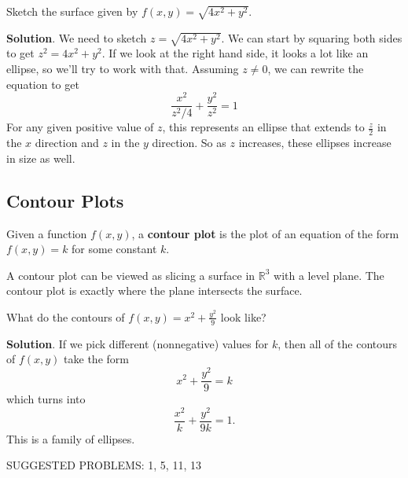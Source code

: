 \documentclass[10pt,]{book}
\newcommand{\terminology}[1]{\textbf{#1}}
\theoremstyle{ptxplainnotitle}
\theoremstyle{ptxplaintitle}
\theoremstyle{ptxplainnotitle}
\theoremstyle{ptxplaintitle}
\theoremstyle{ptxplainnotitle}
\theoremstyle{ptxplaintitle}
\theoremstyle{ptxdefinitionnotitle}
\theoremstyle{ptxdefinitiontitle}
\theoremstyle{ptxdefinitionnotitle}
\theoremstyle{ptxdefinitiontitle}
\theoremstyle{ptxdefinitionnotitle}
\theoremstyle{ptxdefinitiontitle}
\theoremstyle{ptxdefinitionnotitle}
\theoremstyle{ptxdefinitiontitle}
\theoremstyle{ptxdefinitionnotitle}
\theoremstyle{ptxdefinitiontitle}
\numberwithin{equation}{section}
\newcommand{\RR}{\mathbb{R}}
\begin{document}
\begin{example}\label{example-sketching-a-cone}
\hypertarget{p-990}{}%
Sketch the surface given by \(f(x,y) = \sqrt{4x^{2} + y^{2}}\).%
\par\smallskip%
\noindent\textbf{Solution}.\hypertarget{solution-150}{}\quad%
\hypertarget{p-991}{}%
We need to sketch \(z = \sqrt{4x^{2} + y^{2}}\). We can start by squaring both sides to get \(z^{2} = 4x^{2} + y^{2}\). If we look at the right hand side, it looks a lot like an ellipse, so we'll try to work with that. Assuming \(z\neq0\), we can rewrite the equation to get%
\begin{equation*}
\frac{x^{2}}{z^{2}/4} + \frac{y^{2}}{z^{2}} = 1
\end{equation*}
For any given positive value of \(z\), this represents an ellipse that extends to \(\frac{z}{2}\) in the \(x\) direction and \(z\) in the \(y\) direction. So as \(z\) increases, these ellipses increase in size as well.%
\end{example}
\typeout{************************************************}
\typeout{************************************************}
\subsection[{Contour Plots}]{Contour Plots}\label{subsection-contour-plots}
\begin{definition}\label{definition-contour-plots}
\hypertarget{p-992}{}%
Given a function \(f(x,y)\), a \terminology{contour plot} is the plot of an equation of the form \(f(x,y) = k\) for some constant \(k\).%
\end{definition}
\hypertarget{p-993}{}%
A contour plot can be viewed as slicing a surface in \(\RR^{3}\) with a level plane. The contour plot is exactly where the plane intersects the surface.%
\begin{example}\label{example-contours-on-a-paraboloid}
\hypertarget{p-994}{}%
What do the contours of \(f(x,y) = x^{2} + \frac{y^{2}}{9}\) look like?%
\par\smallskip%
\noindent\textbf{Solution}.\hypertarget{solution-151}{}\quad%
\hypertarget{p-995}{}%
If we pick different (nonnegative) values for \(k\), then all of the contours of \(f(x,y)\) take the form%
\begin{equation*}
x^{2} + \frac{y^{2}}{9} = k
\end{equation*}
which turns into%
\begin{equation*}
\frac{x^{2}}{k} + \frac{y^{2}}{{9k}} = 1.
\end{equation*}
This is a family of ellipses.%
\end{example}
\hypertarget{p-996}{}%
SUGGESTED PROBLEMS: 1, 5, 11, 13%
\typeout{************************************************}
\typeout{************************************************}
\end{document}
